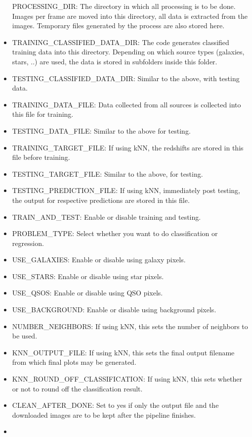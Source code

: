 \documentclass{article}
\begin{document}
\begin{itemize}
  PROCESSING\_DIR: The directory in which all processing is to be done.
  Images per frame are moved into this directory, all data is extracted
  from the images. Temporary files generated by the process are also
  stored here.
\item
  TRAINING\_CLASSIFIED\_DATA\_DIR: The code generates classified
  training data into this directory. Depending on which source types
  (galaxies, stars, ..) are used, the data is stored in subfolders
  inside this folder.
\item
  TESTING\_CLASSIFIED\_DATA\_DIR: Similar to the above, with testing
  data.
\item
  TRAINING\_DATA\_FILE: Data collected from all sources is collected
  into this file for training.
\item
  TESTING\_DATA\_FILE: Similar to the above for testing.
\item
  TRAINING\_TARGET\_FILE: If using kNN, the redshifts are stored in this
  file before training.
\item
  TESTING\_TARGET\_FILE: Similar to the above, for testing.
\item
  TESTING\_PREDICTION\_FILE: If using kNN, immediately post testing, the
  output for respective predictions are stored in this file.
\item
  TRAIN\_AND\_TEST: Enable or disable training and testing.
\item
  PROBLEM\_TYPE: Select whether you want to do classification or
  regression.
\item
  USE\_GALAXIES: Enable or disable using galaxy pixels.
\item
  USE\_STARS: Enable or disable using star pixels.
\item
  USE\_QSOS: Enable or disable using QSO pixels.
\item
  USE\_BACKGROUND: Enable or disable using background pixels.
\item
  NUMBER\_NEIGHBORS: If using kNN, this sets the number of neighbors to
  be used.
\item
  KNN\_OUTPUT\_FILE: If using kNN, this sets the final output filename
  from which final plots may be generated.
\item
  KNN\_ROUND\_OFF\_CLASSIFICATION: If using kNN, this sets whether or
  not to round off the classification result.
\item
  CLEAN\_AFTER\_DONE: Set to yes if only the output file and the
  downloaded images are to be kept after the pipeline finishes.
\item

\end{itemize}
\end{document}
